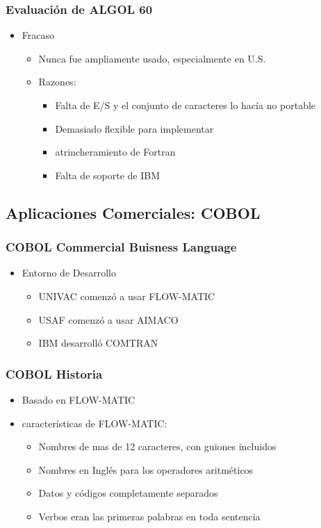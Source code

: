 \documentclass[11pt]{article}
\begin{document}
\subsubsection*{Evaluación de ALGOL 60}
\label{sec:orgheadline61}
\begin{itemize}
\item Fracaso
\begin{itemize}
\item Nunca fue ampliamente usado, especialmente en U.S.
\item Razones:
\begin{itemize}
\item Falta de E/S y el conjunto de caracteres lo hacía no portable
\item Demasiado flexible para implementar
\item atrincheramiento de Fortran
\item Falta de soporte de IBM
\end{itemize}
\end{itemize}
\end{itemize}

\subsection*{Aplicaciones Comerciales: COBOL}
\label{sec:orgheadline68}

\subsubsection*{COBOL Commercial Buisness Language}
\label{sec:orgheadline63}
\begin{itemize}
\item Entorno de Desarrollo
\begin{itemize}
\item UNIVAC comenzó a usar FLOW-MATIC
\item USAF comenzó a usar AIMACO
\item IBM desarrolló COMTRAN
\end{itemize}
\end{itemize}

\subsubsection*{COBOL Historia}
\label{sec:orgheadline64}
\begin{itemize}
\item Basado en FLOW-MATIC
\item características de FLOW-MATIC:
\begin{itemize}
\item Nombres de mas de 12 caracteres, con guiones incluidos
\item Nombres en Inglés para los operadores aritméticos
\item Datos y códigos completamente separados
\item Verbos eran las primeras palabras en toda sentencia
\end{itemize}
\end{itemize}
\end{document}
